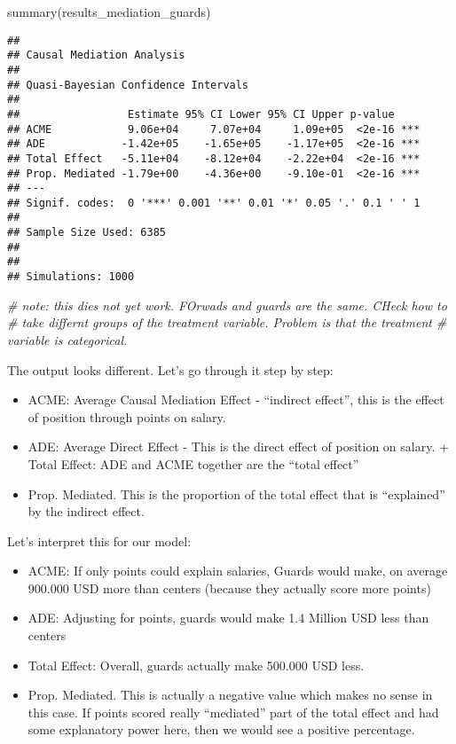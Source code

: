 \documentclass[
]{book}
\newenvironment{Shaded}{\begin{snugshade}}{\end{snugshade}}
\newcommand{\CommentTok}[1]{\textcolor[rgb]{0.56,0.35,0.01}{\textit{#1}}}
\newcommand{\FunctionTok}[1]{\textcolor[rgb]{0.00,0.00,0.00}{#1}}
\newcommand{\FunctionTok}[1]{\textcolor[rgb]{0.13,0.29,0.53}{\textbf{#1}}}
\newcommand{\NormalTok}[1]{#1}
\providecommand{\tightlist}{%
  \setlength{\itemsep}{0pt}\setlength{\parskip}{0pt}}
\begin{document}
\begin{Shaded}
\begin{Highlighting}[]
\FunctionTok{summary}\NormalTok{(results\_mediation\_guards)}
\end{Highlighting}
\end{Shaded}

\begin{verbatim}
## 
## Causal Mediation Analysis 
## 
## Quasi-Bayesian Confidence Intervals
## 
##                 Estimate 95% CI Lower 95% CI Upper p-value    
## ACME            9.06e+04     7.07e+04     1.09e+05  <2e-16 ***
## ADE            -1.42e+05    -1.65e+05    -1.17e+05  <2e-16 ***
## Total Effect   -5.11e+04    -8.12e+04    -2.22e+04  <2e-16 ***
## Prop. Mediated -1.79e+00    -4.36e+00    -9.10e-01  <2e-16 ***
## ---
## Signif. codes:  0 '***' 0.001 '**' 0.01 '*' 0.05 '.' 0.1 ' ' 1
## 
## Sample Size Used: 6385 
## 
## 
## Simulations: 1000
\end{verbatim}

\begin{Shaded}
\begin{Highlighting}[]
\CommentTok{\# note: this dies not yet work. FOrwads and guards are the same. CHeck how to }
\CommentTok{\# take differnt groups of the treatment variable. Problem is that the treatment}
\CommentTok{\# variable is categorical.}
\end{Highlighting}
\end{Shaded}

The output looks different. Let's go through it step by step:

\begin{itemize}
\tightlist
\item
  ACME: Average Causal Mediation Effect - ``indirect effect'', this is the effect of position through points on salary.\\
\item
  ADE: Average Direct Effect - This is the direct effect of position on salary. + Total Effect: ADE and ACME together are the ``total effect''\\
\item
  Prop. Mediated. This is the proportion of the total effect that is ``explained'' by the indirect effect.
\end{itemize}

Let's interpret this for our model:

\begin{itemize}
\tightlist
\item
  ACME: If only points could explain salaries, Guards would make, on average 900.000 USD more than centers (because they actually score more points)
\item
  ADE: Adjusting for points, guards would make 1.4 Million USD less than centers
\item
  Total Effect: Overall, guards actually make 500.000 USD less.
\item
  Prop. Mediated. This is actually a negative value which makes no sense in this case. If points scored really ``mediated'' part of the total effect and had some explanatory power here, then we would see a positive percentage.
\end{itemize}
\end{document}
